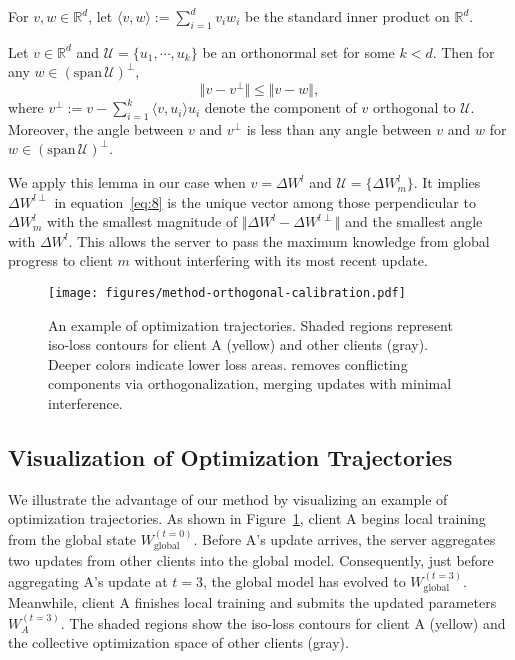 For $v, w \in \mathbb R^d$, let $\langle v, w \rangle := \sum_{i=1}^d v_i w_i$ be the standard inner product on $\mathbb R^d$.
\begin{lemma}
\label{eq:lemma}
    Let $v \in \mathbb R^d$ and $\mathcal{U} = \{u_1, \cdots, u_k\}$ be an orthonormal set for some $k < d$. Then for any $w \in (\mathrm{span}\,\mathcal{U})^\perp$, 
    \begin{equation}
        \label{eq:4}
        \Vert v - v^\perp \Vert \le \Vert v - w \Vert,
    \end{equation}
    where $v^\perp:= v - \sum_{i=1}^k \langle v, u_i\rangle u_i$ denote the component of $v$ orthogonal to $\mathcal{U}$. Moreover, the angle between $v$ and $v^\perp$ is less than any angle between $v$ and $w$ for $w \in (\mathrm{span}\,\mathcal{U})^\perp$.
\end{lemma}

We apply this lemma in our case when $v = \Delta W^l$ and $\mathcal{U} = \{\Delta W_m^l\}$. It implies $\Delta W^{l\perp}$ in equation~\eqref{eq:8} is the unique vector among those perpendicular to $\Delta W_m^l$ with the smallest magnitude of $\Vert \Delta W^l - \Delta W^{l\perp}\Vert$ and the smallest angle with $\Delta W^l$. This allows the server to pass the maximum knowledge from global progress to client $m$ without interfering with its most recent update.

\begin{figure}[t]
\centering
    \texttt{[image: figures/method-orthogonal-calibration.pdf]}
    \caption{An example of optimization trajectories. Shaded regions represent iso-loss contours for client A (yellow) and other clients (gray). Deeper colors indicate lower loss areas. \our removes conflicting components via orthogonalization, merging updates with minimal interference.
    }
\label{fig:method-orthogonal-calibration}
\end{figure}

\subsection{Visualization of Optimization Trajectories}
We illustrate the advantage of our method by visualizing an example of optimization trajectories. As shown in Figure~\ref{fig:method-orthogonal-calibration}, client A begins local training from the global state $W^{(t=0)}_\text{global}$. Before A's update arrives, the server aggregates two updates from other clients into the global model. Consequently, just before aggregating A's update at $t=3$, the global model has evolved to $W^{(t=3)}_\text{global}$. Meanwhile, client A finishes local training and submits the updated parameters $W^{(t=3)}_A$. The shaded regions show the iso-loss contours for client A (yellow) and the collective optimization space of other clients (gray).

